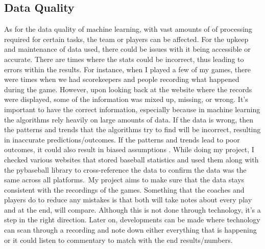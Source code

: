 \documentclass[10pt,twocolumn]{article}
\begin{document}
\subsection{Data Quality}
As for the data quality of machine learning, with vast amounts of of processing required for certain tasks, the team or players can be affected. For the upkeep and maintenance of data used, there could be issues with it being accessible or accurate. There are times where the stats could be incorrect, thus leading to errors within the results. For instance, when I played a few of my games, there were times when we had scorekeepers and people recording what happened during the game. However, upon looking back at the website where the records were displayed, some of the information was mixed up, missing, or wrong. It’s important to have the correct information, especially because in machine learning the algorithms rely heavily on large amounts of data. If the data is wrong, then the patterns and trends that the algorithms try to find will be incorrect, resulting in inaccurate predictions/outcomes. If the patterns and trends lead to poor outcomes, it could also result in biased assumptions \cite{22}. While doing my project, I checked various websites that stored baseball statistics and used them along with the pybaseball library to cross-reference the data to confirm the data was the same across all platforms. My project aims to make sure that the data stays consistent with the recordings of the games. Something that the coaches and players do to reduce any mistakes is that both will take notes about every play and at the end, will compare. Although this is not done through technology, it’s a step in the right direction. Later on, developments can be made where technology can scan through a recording and note down either everything that is happening or it could listen to commentary to match with the end results/numbers. 
\end{document}
